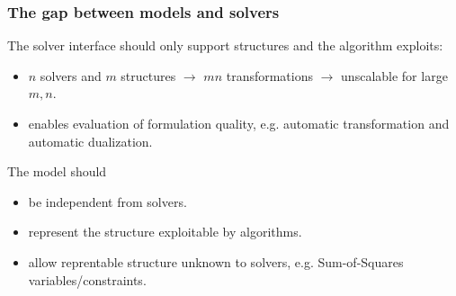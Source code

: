\documentclass{beamer}
\begin{document}
  \begin{frame}
    \frametitle{The gap between models and solvers}
    The solver interface should only support structures and the algorithm \alert{exploits}:
    \begin{itemize}
      \item
        $n$ solvers and $m$ structures $\to$ $mn$ transformations $\to$ \alert{unscalable} for large $m, n$.
      \item
        enables \alert{evaluation} of formulation \alert{quality}, e.g. automatic transformation and
        automatic dualization.
    \end{itemize}

    The model should
    \begin{itemize}
      \item be \alert{independent} from solvers.
      \item represent the structure \alert{exploitable} by algorithms.
      \item allow reprentable structure \alert{unknown} to solvers, e.g. Sum-of-Squares variables/constraints.
    \end{itemize}
  \end{frame}

\end{document}
